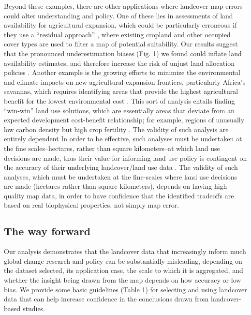 \documentclass{pnastwo}
\begin{document}
\begin{article}
Beyond these examples, there are other applications where landcover map errors could alter understanding and policy. One of these lies in assessments of land availability for agricultural expansion, which could be particularly erroneous if they use a ``residual approach'' \cite{lambin_estimating_????}, where existing cropland and other occupied cover types are used to filter a map of potential suitability. Our results suggest that the pronounced underestimation biases (Fig. 1) we found could inflate land availability estimates, and therefore increase the risk of unjust land allocation policies \cite{rulli_global_2013}. Another example is the growing efforts to minimize the environmental and climate impacts on new agricultural expansion frontiers, particularly Africa's savannas, which requires identifying areas that provide the highest agricultural benefit for the lowest environmental cost \cite{searchinger_high_2015}. This sort of analysis entails finding ``win-win'' land use solutions, which are essentially areas that deviate from an expected development cost-benefit relationship; for example, regions of unusually low carbon density but high crop fertility \cite{searchinger_high_2015}. The validity of such analysis are entirely dependent In order to be effective, such analyses must be undertaken at the fine scales--hectares, rather than square kilometers--at which land use decisions are made, thus their value for informing land use policy is contingent on the accuracy of their underlying landcover/land use data \cite{searchinger_high_2015}. The validity of such analyses, which must be undertaken at the fine-scales where land use decisions are made (hectares rather than square kilometers), depends on having high quality map data, in order to have confidence that the identified tradeoffs are based on real biophysical properties, not simply map error.

\subsection{The way forward}
Our analysis demonstrates that the landcover data that increasingly inform much global change research and policy can be substantially misleading, depending on the dataset selected, its application case, the scale to which it is aggregated, and whether the insight being drawn from the map depends on how accuracy or low bias. We provide some basic guidelines (Table 1) for selecting and using landcover data that can help increase confidence in the conclusions drawn from landcover-based studies. 


\end{article}
\end{document}
